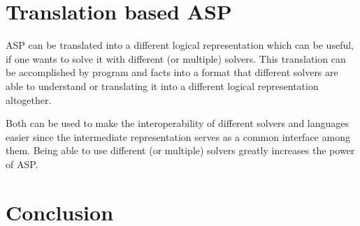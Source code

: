 \documentclass[runningheads]{llncs}
\begin{document}
\begin{comment}
\subsection{other things}

Explains details about syntax

Syntax and semantic of the language is explained by example of the seating problem. By providing the code that is solving an instance of this problem and then giving the intuitive meaning of the code to the reader. Other example is locking design. How to define defaults (Exit of house is room 1). How to define recursion: Rooms are reachable indirectly. Also given an example of how to search for the minimal number of doors needed: Set a limit of doors available and increase this limit over time. 

Example also shows that ASP can be used for computationally difficult problems. Janhunen and Niemelä show that the locking design problem (ldp) is NP-Complete\footnote{NP-complete is a subset of NP and the intersection of NP and NP-hard. It represents a set of problems to which all problems in NP can be reduced to in polynomial time using a deterministic Turing machine.}. This is by reducing Exact-3-SAT, an NP-problem, to ldp in polynomial time. 
\end{comment}






\section{Translation based ASP} \label{sec:translation}

ASP can be translated into a different logical representation which can be useful, if one wants to solve it with different (or multiple) solvers. This translation can be accomplished by   program and facts into a format that different solvers are able to understand or  translating it into a different logical representation altogether.

Both can be used to make the interoperability of different solvers and languages easier since the intermediate representation serves as a  common interface among them. Being able to use different (or multiple) solvers greatly increases the power of ASP. 

\section{Conclusion}
\end{document}
